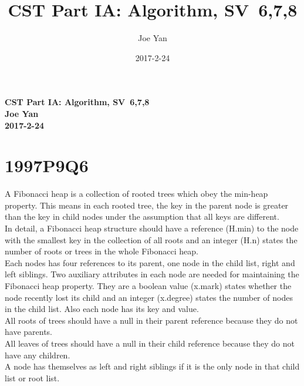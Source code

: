 \documentclass[10pt,twoside,a4paper]{article}
\newcommand{\studentname}{Joe Yan}
\newcommand{\svworkdate}{2017-2-24}
\newcommand{\svcourse}{CST Part IA: Algorithm}
\newcommand{\svnumber}{6,7,8}
\begin{document}
\author{\studentname}
\title{\svcourse, SV~\svnumber}
\date{\svworkdate}

\textbf{\svcourse, SV~\svnumber}\\
\textbf{\studentname}\\
\textbf{\svworkdate}\\

\section{1997P9Q6}
A Fibonacci heap is a collection of rooted trees which obey the min-heap property. This means in each rooted tree, the key in the parent node is greater than the key in child nodes under the assumption that all keys are different.
\\In detail, a Fibonacci heap structure should have a reference (H.min) to the node with the smallest key in the collection of all roots and an integer (H.n) states the number of roots or trees in the whole Fibonacci heap.
\\Each nodes has four references to its parent, one node in the child list, right and left siblings. Two auxiliary attributes in each node are needed for maintaining the Fibonacci heap property. They are a boolean value (x.mark) states whether the node recently lost its child and an integer (x.degree) states the number of nodes in the child list. Also each node has its key and value.
\\All roots of trees should have a null in their parent reference because they do not have parents.
\\All leaves of trees should have a null in their child reference because they do not have any children.
\\A node has themselves as left and right siblings if it is the only node in that child list or root list.
\end{document}
